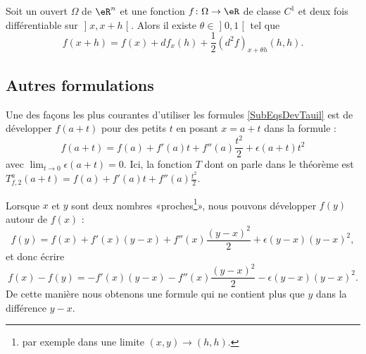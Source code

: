 \begin{proposition}     \label{PROPooWWMYooPOmSds}
Soit un ouvert \( \Omega\) de \( \eR^n\) et une fonction \( f\colon \Omega\to \eR\) de classe \( C^1\) et deux fois différentiable sur \( \mathopen] x , x+h \mathclose[\). Alors il existe \( \theta\in \mathopen] 0 , 1 \mathclose[\) tel que
    \begin{equation}
        f(x+h)=f(x)+df_x(h)+\frac{ 1 }{2}(d^2f)_{x+\theta h}(h,h).
    \end{equation}
\end{proposition}

\subsection{Autres formulations}

\begin{example}		\label{ExempleUtlDev}
	Une des façons les plus courantes d'utiliser les formules \eqref{SubEqsDevTauil} est de développer $f(a+t)$ pour des petits $t$ en posant $x=a+t$ dans la formule :
	\begin{equation}	\label{EqDevfautouraeps}
		f(a+t)=f(a)+f'(a)t+f''(a)\frac{ t^2 }{ 2 }+\epsilon(a+t)t^2
	\end{equation}
	avec $\lim_{t\to 0} \epsilon(a+t)=0$. Ici, la fonction $T$ dont on parle dans le théorème est $T_{f,2}^a(a+t)=f(a)+f'(a)t+f''(a)\frac{ t^2 }{2}$.

	Lorsque $x$ et $y$ sont deux nombres «proches\footnote{par exemple dans une limite $(x,y)\to(h,h)$.}», nous pouvons développer $f(y)$ autour de $f(x)$ :
	\begin{equation}		\label{Eqfydevfx}
		f(y)=f(x)+f'(x)(y-x)+f''(x)\frac{ (y-x)^2 }{ 2 }+\epsilon(y-x)(y-x)^2,
	\end{equation}
	et donc écrire
	\begin{equation}
		f(x)-f(y)=-f'(x)(y-x)-f''(x)\frac{ (y-x)^2 }{ 2 }-\epsilon(y-x)(y-x)^2.
	\end{equation}
	De cette manière nous obtenons une formule qui ne contient plus que $y$ dans la différence $y-x$.
\end{example}

